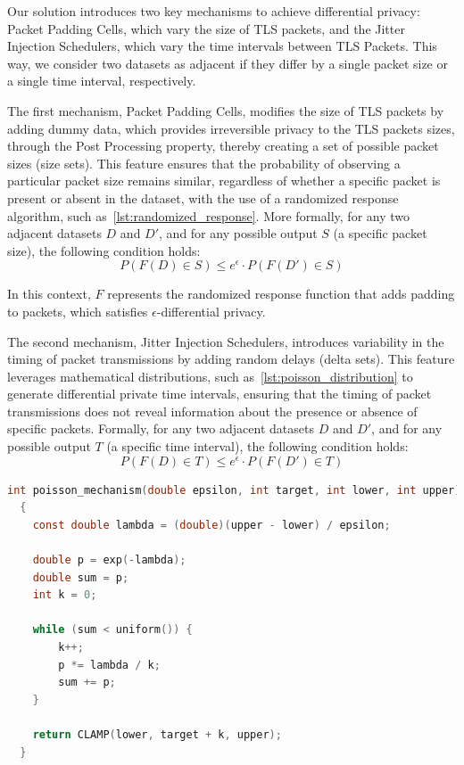 Our solution introduces two key mechanisms to achieve differential privacy: Packet Padding Cells, which vary the size of TLS packets, and the Jitter Injection Schedulers, which vary the time intervals between TLS Packets. This way, we consider two datasets as adjacent if they differ by a single packet size or a single time interval, respectively.

The first mechanism, Packet Padding Cells, modifies the size of TLS packets by adding dummy data, which provides irreversible privacy to the TLS packets sizes, through the Post Processing property, thereby creating a set of possible packet sizes (size sets). This feature ensures that the probability of observing a particular packet size remains similar, regardless of whether a specific packet is present or absent in the dataset, with the use of a randomized response algorithm, such as~\autoref{lst:randomized_response}. 
More formally, for any two adjacent datasets $D$ and $D'$, and for any possible output $S$ (a specific packet size), the following condition holds:
\[P(F(D) \in S) \leq e^{\epsilon} \cdot P(F(D') \in S)\]

In this context, $F$ represents the randomized response function that adds padding to packets, which satisfies $\epsilon$-differential privacy. 

The second mechanism, Jitter Injection Schedulers, introduces variability in the timing of packet transmissions by adding random delays (delta sets). This feature leverages mathematical distributions, such as~\autoref{lst:poisson_distribution} to generate differential private time intervals, ensuring that the timing of packet transmissions does not reveal information about the presence or absence of specific packets. Formally, for any two adjacent datasets $D$ and $D'$, and for any possible output $T$ (a specific time interval), the following condition holds:
\[P(F(D) \in T) \leq e^{\epsilon} \cdot P(F(D') \in T)\]

\begin{lstlisting}[language=C, caption={Poisson Distribution Pseudo-Random Number Generator implementation.}, label={lst:poisson_distribution}]
  int poisson_mechanism(double epsilon, int target, int lower, int upper)
  {
    const double lambda = (double)(upper - lower) / epsilon;

    double p = exp(-lambda);
    double sum = p;
    int k = 0;

    while (sum < uniform()) {
        k++;
        p *= lambda / k;
        sum += p;
    }

    return CLAMP(lower, target + k, upper);
  }
\end{lstlisting}

